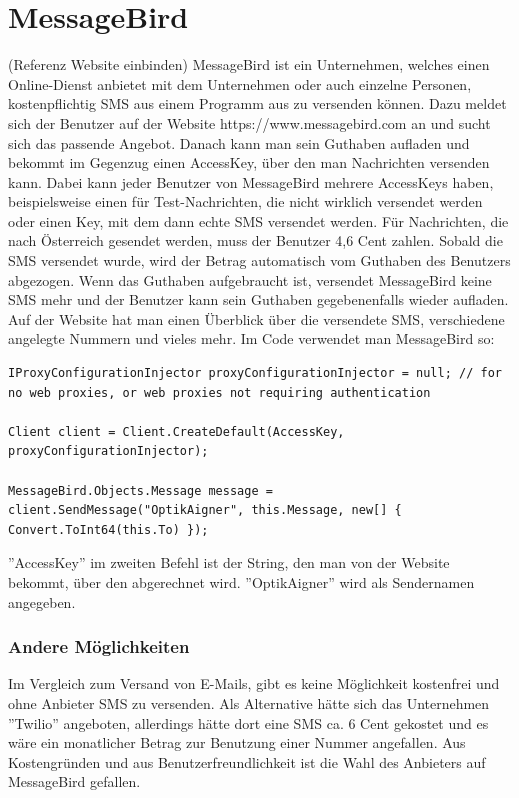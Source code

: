\section{MessageBird}
(Referenz Website einbinden) MessageBird ist ein Unternehmen, welches einen Online-Dienst anbietet mit dem  Unternehmen oder auch einzelne Personen, kostenpflichtig SMS aus einem Programm aus zu versenden können. Dazu meldet sich der Benutzer auf der Website https://www.messagebird.com an und sucht sich das passende Angebot. Danach kann man sein Guthaben aufladen und bekommt im Gegenzug einen AccessKey, über den man Nachrichten versenden kann. Dabei kann jeder Benutzer von MessageBird mehrere AccessKeys haben, beispielsweise einen für Test-Nachrichten, die nicht wirklich versendet werden oder einen Key, mit dem dann echte SMS versendet werden. Für Nachrichten, die nach Österreich gesendet werden, muss der Benutzer 4,6 Cent zahlen. Sobald die SMS versendet wurde, wird der Betrag automatisch vom Guthaben des Benutzers abgezogen. Wenn das Guthaben aufgebraucht ist, versendet MessageBird keine SMS mehr und der Benutzer kann sein Guthaben gegebenenfalls wieder aufladen. Auf der Website hat man einen Überblick über die versendete SMS, verschiedene angelegte Nummern und vieles mehr. Im Code verwendet man MessageBird so:
\begin{lstlisting}
IProxyConfigurationInjector proxyConfigurationInjector = null; // for no web proxies, or web proxies not requiring authentication

Client client = Client.CreateDefault(AccessKey, proxyConfigurationInjector);

MessageBird.Objects.Message message = client.SendMessage("OptikAigner", this.Message, new[] { Convert.ToInt64(this.To) });
\end{lstlisting}

''AccessKey'' im zweiten Befehl ist der String, den man von der Website bekommt, über den abgerechnet wird. ''OptikAigner'' wird als Sendernamen angegeben.

\subsubsection{Andere Möglichkeiten}
Im Vergleich zum Versand von E-Mails, gibt es keine Möglichkeit kostenfrei und ohne Anbieter SMS zu versenden. Als Alternative hätte sich das Unternehmen ''Twilio'' angeboten, allerdings hätte dort eine SMS ca. 6 Cent gekostet und es wäre ein monatlicher Betrag zur Benutzung einer Nummer angefallen. Aus Kostengründen und aus Benutzerfreundlichkeit ist die Wahl des Anbieters auf MessageBird gefallen.
